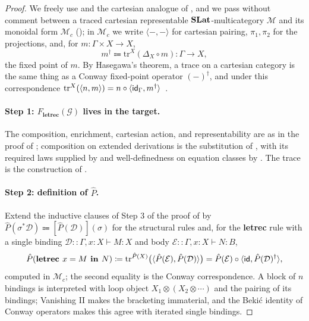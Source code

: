 \begin{proof}
We freely use  and the cartesian analogue of , and we pass without comment between a traced cartesian representable $\mathbf{SLat}$-multicategory $\mathcal{M}$ and its monoidal form $\mathcal{M}_c$ (); in $\mathcal{M}_c$ we write $\langle -, - \rangle$ for cartesian pairing, $\pi_1, \pi_2$ for the projections, and, for $m : \Gamma \times X \to X$,
\[
m^{\dagger} \Coloneqq \text{tr}^{X}(\Delta_X \circ m) : \Gamma \to X,
\]
the fixed point of $m$.
By Hasegawa's theorem, a trace on a cartesian category is the same thing as a Conway fixed-point operator $(-)^{\dagger}$, and under this correspondence $\text{tr}^{X}(\langle n, m \rangle) = n \circ \langle \textsf{id}_{\Gamma}, m^{\dagger} \rangle$~\cite{hasegawa_models_1999}.

\paragraph{Step 1: $F_{\textbf{letrec}}(\mathcal{G})$ lives in the target.}
The composition, enrichment, cartesian action, and representability are as in the proof of ; composition on extended derivations is the substitution of , with its required laws supplied by  and well-definedness on equation classes by .  The trace is the construction of .

\paragraph{Step 2: definition of $\hat{P}$.}
Extend the inductive clauses of Step 3 of the proof of  by $\hat{P}(\sigma^{*}\mathcal{D}) \Coloneqq [\hat{P}(\mathcal{D})](\sigma)$ for the structural rules and, for the \textbf{letrec} rule with a single binding $\mathcal{D} :: \Gamma, x : X \vdash M : X$ and body $\mathcal{E} :: \Gamma, x : X \vdash N : B$,
\[
\hat{P}(\textbf{letrec } x = M \textbf{ in } N) \mathrel{\vcentcolon\mathrel{\mkern-1.2mu}=} \text{tr}^{\hat{P}(X)}\bigl( \langle \hat{P}(\mathcal{E}), \hat{P}(\mathcal{D}) \rangle \bigr) = \hat{P}(\mathcal{E}) \circ \langle \textsf{id}, \hat{P}(\mathcal{D})^{\dagger} \rangle,
\]
computed in $\mathcal{M}_c$; the second equality is the Conway correspondence.
A block of $n$ bindings is interpreted with loop object $X_1 \otimes (X_2 \otimes \cdots)$ and the pairing of its bindings; Vanishing II makes the bracketing immaterial, and the Beki\'{c} identity of Conway operators makes this agree with iterated single bindings.


\end{proof}
